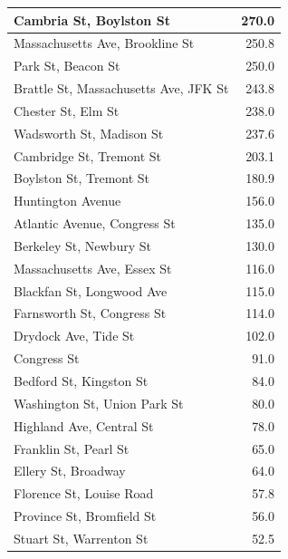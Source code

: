 \documentclass[twocolumn,10pt]{asme2ej}
\begin{document}
\begin{tabular}{| l | r |}
\hline
Cambria St, Boylston St & 270.0 \\
\hline
Massachusetts Ave, Brookline St & 250.8 \\
\hline
Park St, Beacon St & 250.0 \\
\hline
Brattle St, Massachusetts Ave, JFK St & 243.8 \\
\hline
Chester St, Elm St & 238.0 \\
\hline
Wadsworth St, Madison St & 237.6 \\
\hline
Cambridge St, Tremont St & 203.1 \\
\hline
Boylston St, Tremont St & 180.9 \\
\hline
Huntington Avenue & 156.0 \\
\hline
Atlantic Avenue, Congress St & 135.0 \\
\hline
Berkeley St, Newbury St & 130.0 \\
\hline
Massachusetts Ave, Essex St & 116.0 \\
\hline
Blackfan St, Longwood Ave & 115.0 \\
\hline
Farnsworth St, Congress St & 114.0 \\
\hline
Drydock Ave, Tide St & 102.0 \\
\hline
Congress St & 91.0 \\
\hline
Bedford St, Kingston St & 84.0 \\
\hline
Washington St, Union Park St & 80.0 \\
\hline
Highland Ave, Central St & 78.0 \\
\hline
Franklin St, Pearl St & 65.0 \\
\hline
Ellery St, Broadway & 64.0 \\
\hline
Florence St, Louise Road & 57.8 \\
\hline
Province St, Bromfield St & 56.0 \\
\hline
Stuart St, Warrenton St & 52.5 \\
\hline
\end{tabular}
\end{document}
